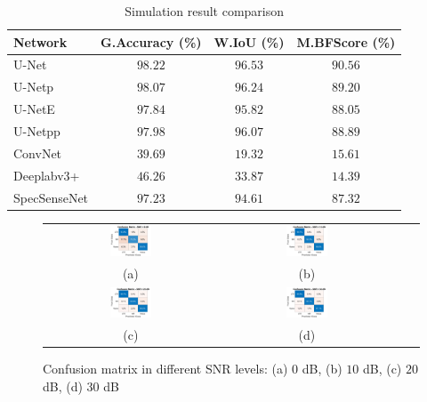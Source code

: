 \documentclass[journal]{IEEEtran} %
\begin{document}
\begin{table}[!t]
\centering
\caption{Simulation result comparison}
\label{tab3}
\begin{tabular}{l|c|c|c}
\hline
\textbf{Network}  & \textbf{G.Accuracy (\%)} & \textbf{W.IoU (\%)} & \textbf{M.BFScore (\%)} \\
\hline
U-Net  \cite{ronneberger2015u} & $98.22$   &  $96.53$ & $90.56$ \\
U-Netp  \cite{zhou2019unet++} & $98.07$   &  $96.24$ & $89.20$ \\
U-NetE  \cite{zhou2019unet++} & $97.84$   & $95.82$  & $88.05$ \\
U-Netpp \cite{zhou2019unet++}   & $97.98$   & $96.07$ & $88.89$ \\
ConvNet \cite{huynhthe2023intelligence}   & $39.69$  & $19.32$ & $15.61$ \\
Deeplabv3+ \cite{nguyen2023accurate}  & $46.26$  &  $33.87$ & $14.39$ \\
SpecSenseNet  & $97.23$  & $94.61$ & $87.32$  \\
\hline
\end{tabular}
\end{table}
\begin{figure}[!t]
    \centering
    \footnotesize
    \begin{tabular}{cccc}
        \includegraphics[width=0.25\textwidth]{img/confusion_matrix_0dB.jpg} & 
        \includegraphics[width=0.25\textwidth]{img/confusion_matrix_10dB.jpg} & \\ (a) & (b) \\
        \includegraphics[width=0.25\textwidth]{img/confusion_matrix_20dB.jpg} & 
        \includegraphics[width=0.25\textwidth]{img/confusion_matrix_30dB.jpg} & \\ (c) & (d)
    \end{tabular}
    \caption{Confusion matrix in different SNR levels: (a) $0$ dB, (b) $10$ dB, (c) $20$ dB, (d) $30$ dB}
    \label{fig5}
\end{figure}
\end{document}
